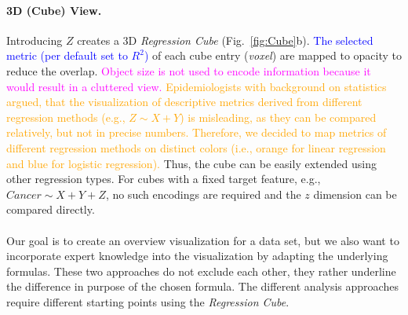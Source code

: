 \documentclass[journal]{style/vgtc} 			          %
\newcommand{\add}[1]{\textcolor{blue}{#1}}
\newcommand{\design}[1]{\textcolor{orange}{#1}}
\newcommand{\magenta}[1]{\textcolor{magenta}{#1}}
\begin{document}
\paragraph{3D (Cube) View.}
Introducing $Z$ creates a 3D \emph{Regression Cube} (Fig.~\ref{fig:Cube}b).
\add{The selected metric (per default set to $R^2$)} of each cube entry (\emph{voxel}) are mapped to opacity to reduce the overlap.
\magenta{Object size is not used to encode information because it would result in a cluttered view.}
\design{
Epidemiologists with background on statistics argued, that the visualization of descriptive metrics derived from different regression methods (e.g., $Z \sim X + Y$) is misleading, as they can be compared relatively, but not in precise numbers.
Therefore, we decided to map metrics of different regression methods on distinct colors (i.e., orange for linear regression and blue for logistic regression).
}
Thus, the cube can be easily extended using other regression types.
For cubes with a fixed target feature, e.g., $Cancer \sim X + Y + Z$, no such encodings are required and the $z$ dimension can be compared directly.
\\\\
Our goal is to create an overview visualization for a data set, but we also want to incorporate expert knowledge into the visualization by adapting the underlying formulas.
These two approaches do not exclude each other, they rather underline the difference in purpose of the chosen formula.
The different analysis approaches require different starting points using the \emph{Regression Cube}.
\end{document}
